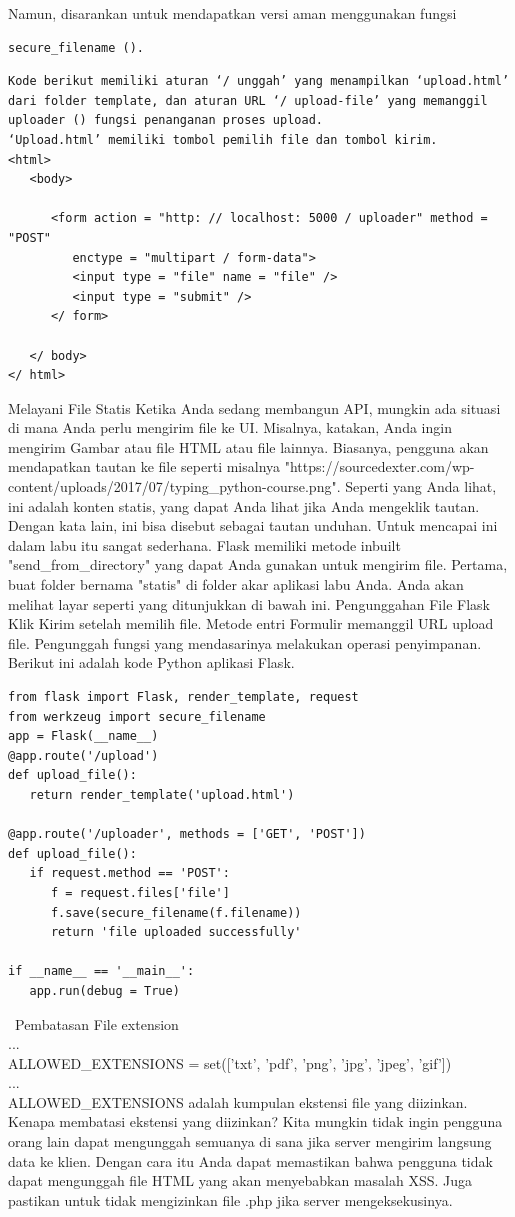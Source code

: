 Namun, disarankan untuk mendapatkan versi aman menggunakan fungsi 
\begin{verbatim}
secure_filename ().
\end{verbatim}
\begin{verbatim}
Kode berikut memiliki aturan ‘/ unggah’ yang menampilkan ‘upload.html’ dari folder template, dan aturan URL ‘/ upload-file’ yang memanggil uploader () fungsi penanganan proses upload.
‘Upload.html’ memiliki tombol pemilih file dan tombol kirim.
<html>
   <body>
   
      <form action = "http: // localhost: 5000 / uploader" method = "POST"
         enctype = "multipart / form-data">
         <input type = "file" name = "file" />
         <input type = "submit" />
      </ form>
      
   </ body>
</ html>
\end{verbatim}
Melayani File Statis
Ketika Anda sedang membangun API, mungkin ada situasi di mana Anda perlu mengirim file ke UI. Misalnya, katakan, Anda ingin mengirim Gambar atau file HTML atau file lainnya. Biasanya, pengguna akan mendapatkan tautan ke file seperti misalnya "https://sourcedexter.com/wp-content/uploads/2017/07/typing\_python-course.png". Seperti yang Anda lihat, ini adalah konten statis, yang dapat Anda lihat jika Anda mengeklik tautan. Dengan kata lain, ini bisa disebut sebagai tautan unduhan.
Untuk mencapai ini dalam labu itu sangat sederhana. Flask memiliki metode inbuilt "send\_from\_directory" yang dapat Anda gunakan untuk mengirim file. Pertama, buat folder bernama "statis" di folder akar aplikasi labu Anda.
Anda akan melihat layar seperti yang ditunjukkan di bawah ini. Pengunggahan File Flask Klik Kirim setelah memilih file. Metode entri Formulir memanggil URL upload file. Pengunggah fungsi yang mendasarinya melakukan operasi penyimpanan.
Berikut ini adalah kode Python aplikasi Flask.
\begin{verbatim}
from flask import Flask, render_template, request
from werkzeug import secure_filename
app = Flask(__name__)
@app.route('/upload')
def upload_file():
   return render_template('upload.html')
	
@app.route('/uploader', methods = ['GET', 'POST'])
def upload_file():
   if request.method == 'POST':
      f = request.files['file']
      f.save(secure_filename(f.filename))
      return 'file uploaded successfully'
		
if __name__ == '__main__':
   app.run(debug = True)
\end{verbatim}
\
Pembatasan File extension\\
...\\
ALLOWED\_EXTENSIONS = set(['txt', 'pdf', 'png', 'jpg', 'jpeg', 'gif'])\\
...\\
ALLOWED\_EXTENSIONS adalah kumpulan ekstensi file yang diizinkan. Kenapa membatasi ekstensi yang diizinkan? Kita mungkin tidak ingin pengguna orang lain dapat mengunggah semuanya di sana jika server mengirim langsung data ke klien. Dengan cara itu Anda dapat memastikan bahwa pengguna tidak dapat mengunggah file HTML yang akan menyebabkan masalah XSS. Juga pastikan untuk tidak mengizinkan file .php jika server mengeksekusinya.
